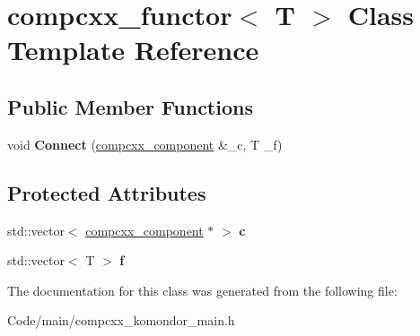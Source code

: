 \hypertarget{classcompcxx__functor}{}\section{compcxx\+\_\+functor$<$ T $>$ Class Template Reference}
\label{classcompcxx__functor}
\subsection*{Public Member Functions}
\begin{DoxyCompactItemize}
\item 
\mbox{\label{classcompcxx__functor_a7b3e1bd13bee34e4cd1d6244fcff6031}} 
void {\bfseries Connect} (\hyperlink{classcompcxx__component}{compcxx\+\_\+component} \&\+\_\+c, T \+\_\+f)
\end{DoxyCompactItemize}
\subsection*{Protected Attributes}
\begin{DoxyCompactItemize}
\item 
\mbox{\label{classcompcxx__functor_ac716643013a9ff09b2fa7d36d3abf9a9}} 
std\+::vector$<$ \hyperlink{classcompcxx__component}{compcxx\+\_\+component} $\ast$ $>$ {\bfseries c}
\item 
\mbox{\label{classcompcxx__functor_af5bb981608846fe8b4801a33238e98d3}} 
std\+::vector$<$ T $>$ {\bfseries f}
\end{DoxyCompactItemize}


The documentation for this class was generated from the following file\+:\begin{DoxyCompactItemize}
\item 
Code/main/compcxx\+\_\+komondor\+\_\+main.\+h\end{DoxyCompactItemize}
